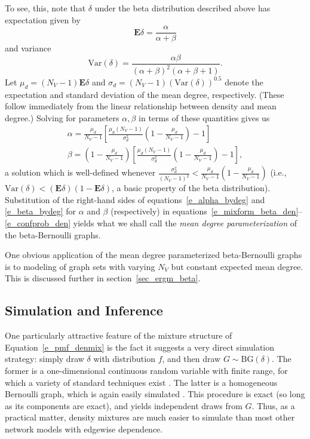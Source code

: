 \documentclass[11pt]{article}
\newcommand{\BG}{\ensuremath{\mathrm{BG}}\xspace}
\begin{document}
To see, this, note that $\delta$ under the beta distribution described above has expectation given by
\begin{equation*}
\mathbf{E} \delta = \frac{\alpha}{\alpha+\beta}
\end{equation*}
and variance
\begin{equation*}
\mathrm{Var}(\delta) = \frac{\alpha\beta}{(\alpha+\beta)^2(\alpha+\beta+1)}.
\end{equation*}
Let $\mu_d=(N_V-1) \mathbf{E}\delta$ and $\sigma_d = (N_V-1) (\mathrm{Var}(\delta))^{0.5}$ denote the expectation and standard deviation of the mean degree, respectively.  (These follow immediately from the linear relationship between density and mean degree.)  Solving for parameters $\alpha,\beta$ in terms of these quantities gives us
\begin{gather}
\alpha = \frac{\mu_d}{N_V-1} \left[\frac{\mu_d (N_V-1)}{\sigma_d^2}\left(1-\frac{\mu_d}{N_V-1}\right) -1\right] \label{e_alpha_bydeg}\\
\beta = \left(1-\frac{\mu_d}{N_V-1}\right) \left[\frac{\mu_d (N_V-1)}{\sigma_d^2}\left(1-\frac{\mu_d}{N_V-1}\right) -1\right], \label{e_beta_bydeg}
\end{gather}
a solution which is well-defined whenever $\tfrac{\sigma_d^2}{(N_V-1)^2}< \tfrac{\mu_d}{N_V-1}\left(1-\tfrac{\mu_d}{N_V-1}\right)$ (i.e., $\mathrm{Var}(\delta)<(\mathbf{E}\delta)(1-\mathbf{E}\delta)$, a basic property of the beta distribution).  Substitution of the right-hand sides of equations~\ref{e_alpha_bydeg} and \ref{e_beta_bydeg} for $\alpha$ and $\beta$ (respectively) in equations~\ref{e_mixform_beta_den}--\ref{e_confprob_den} yields what we shall call the \emph{mean degree parameterization} of the beta-Bernoulli graphs.

One obvious application of the mean degree parameterized beta-Bernoulli graphs is to modeling of graph sets with varying $N_V$ but constant expected mean degree.  This is discussed further in section~\ref{sec_ergm_beta}.

\subsection{Simulation and Inference}

One particularly attractive feature of the mixture structure of Equation~\ref{e_pmf_denmix} is the fact it suggests a very direct simulation strategy: simply draw $\delta$ with distribution $f$, and then draw $G\sim \BG(\delta)$.  The former is a one-dimensional continuous random variable with finite range, for which a variety of standard techniques exist \citep[see, e.g.][]{givens.hoeting:bk:2005}.  The latter is a homogeneous Bernoulli graph, which is again easily simulated \citep[e.g.,][]{batagelj.brandes:pre:2005}.  This procedure is exact (so long as its components are exact), and yields independent draws from $G$.  Thus, as a practical matter, density mixtures are much easier to simulate than most other network models with edgewise dependence.
\end{document}
